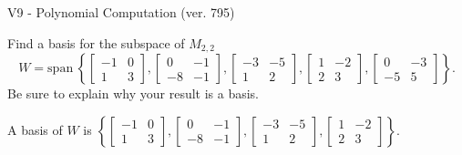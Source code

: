 \begin{exercise}
  \begin{exerciseTitle}V9 - Polynomial Computation (ver. 795)\end{exerciseTitle}
  \begin{exerciseStatement}
    Find a basis for the subspace of \(M_{2,2}\) 
\[W=\mathrm{span}\ \left\{\left[\begin{array}{cc}
-1 & 0 \\
1 & 3
\end{array}\right] , \left[\begin{array}{cc}
0 & -1 \\
-8 & -1
\end{array}\right] , \left[\begin{array}{cc}
-3 & -5 \\
1 & 2
\end{array}\right] , \left[\begin{array}{cc}
1 & -2 \\
2 & 3
\end{array}\right] , \left[\begin{array}{cc}
0 & -3 \\
-5 & 5
\end{array}\right]\right\}.\]
 Be sure to explain why your result is a basis.


  \end{exerciseStatement}
  \begin{exerciseAnswer}
   A basis of \(W\) is  \(\left\{\left[\begin{array}{cc}
-1 & 0 \\
1 & 3
\end{array}\right] , \left[\begin{array}{cc}
0 & -1 \\
-8 & -1
\end{array}\right] , \left[\begin{array}{cc}
-3 & -5 \\
1 & 2
\end{array}\right] , \left[\begin{array}{cc}
1 & -2 \\
2 & 3
\end{array}\right]\right\}\).
  


  \end{exerciseAnswer}
\end{exercise}